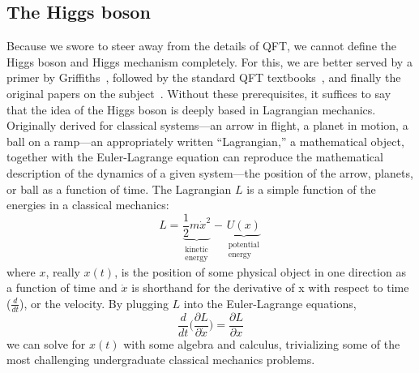 \subsection{The Higgs boson}\label{sec:higgs}
Because we swore to steer away from the details of QFT, we cannot define the Higgs boson and Higgs mechanism completely. 
For this, we are better served by a primer by Griffiths~\cite{GriffithsParticle}, followed by the standard QFT textbooks~\cite{SrednickiQFT, PeskinSchroederQFT}, and finally the original papers on the subject~\cite{EnglertBroutPRL, HiggsPhysLett, HiggsPRL, GuralnikHagenKibblePRL}. 
Without these prerequisites, it suffices to say that the idea of the Higgs boson is deeply based in Lagrangian mechanics. 
Originally derived for classical systems---an arrow in flight, a planet in motion, a ball on a ramp---an appropriately written ``Lagrangian,'' a mathematical object, together with the Euler-Lagrange equation can reproduce the mathematical description of the dynamics of a given system---the position of the arrow, planets, or ball as a function of time. 
The Lagrangian $L$ is a simple function of the energies in a classical mechanics:
\begin{equation}
    L = \underbrace{\frac{1}{2}m\dot{x}^2}_{\substack{\text{kinetic} \\ \text{energy}}} - \underbrace{U(x)}_{\substack{\text{potential} \\ \text{energy}}}
\end{equation}
where $x$, really $x(t)$, is the position of some physical object in one direction as a function of time and $\dot{x}$ is shorthand for the derivative of x with respect to time ($\frac{d}{dt}$), or the velocity. 
By plugging $L$ into the Euler-Lagrange equations, 
\begin{equation}
    \frac{d}{dt}\bigg(\frac{\partial L}{\partial\dot{x}}\bigg) = \frac{\partial L}{\partial x}
\end{equation}
we can solve for $x(t)$ with some algebra and calculus, trivializing some of the most challenging undergraduate classical mechanics problems. 

